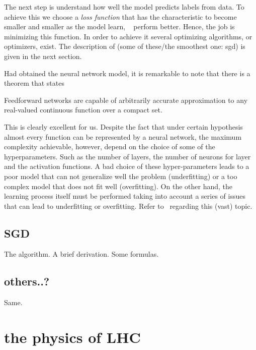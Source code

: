 The next step is understand how well the model predicts labels from data.
To achieve this we choose a \textit{loss function} that has the
characteristic to become smaller and smaller as the model learn, \eg~
perform better. Hence, the job is minimizing this function. In order to achieve
it several optimizing algorithms, or optimizers, exist.
The description of (some of these/the smoothest one: sgd) is given in
the next section.

Had obtained the neural network model, it is remarkable to note that there
is a theorem that states~\cite{theorem}
\begin{teorema}
 Feedforward networks are capable of arbitrarily accurate approximation
 to any real-valued continuous function over a compact set.
\end{teorema}

This is clearly excellent for us. Despite the fact that under certain
hypothesis almost every function can be represented by a neural network,
the maximum complexity achievable, however, depend on the choice of some of the
hyperparameters. Such as the number of layers, the number of neurons
for layer and the activation functions. A bad choice of these
hyper-parameters leads to a poor model that can not generalize well the problem
(underfitting) or a too complex model that does not fit well (overfitting).
On the other hand, the learning process itself must be
performed taking into account a series of issues that can lead to
underfitting or overfitting. Refer to~\cite{deeplearningbook} regarding
this (vast) topic.
\subsection{SGD}
The algorithm. A brief derivation. Some formulas.


\subsection{others..?}
Same.

\section{the physics of LHC}

